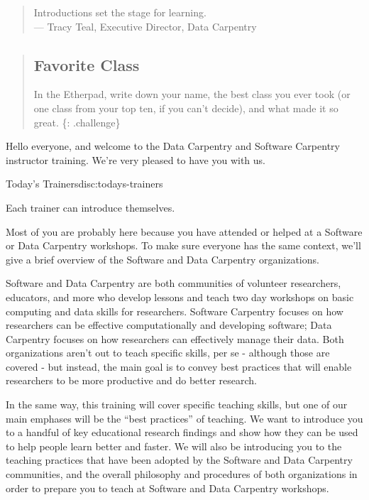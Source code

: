 
\begin{quote}
Introductions set the stage for learning.\\--- Tracy Teal, Executive
Director, Data Carpentry
\end{quote}

\begin{quote}
\subsection{Favorite Class}\label{favorite-class}

In the Etherpad, write down your name, the best class you ever took (or
one class from your top ten, if you can't decide), and what made it so
great. \{: .challenge\}
\end{quote}

Hello everyone, and welcome to the Data Carpentry and Software Carpentry
instructor training. We're very pleased to have you with us.

\begin{discussion}{Today's Trainers}{disc:todays-trainers}

Each trainer can introduce themselves.

\end{discussion}

Most of you are probably here because you have attended or helped at a
Software or Data Carpentry workshops. To make sure everyone has the same
context, we'll give a brief overview of the Software and Data Carpentry
organizations.

Software and Data Carpentry are both communities of volunteer
researchers, educators, and more who develop lessons and teach two day
workshops on basic computing and data skills for researchers. Software
Carpentry focuses on how researchers can be effective computationally
and developing software; Data Carpentry focuses on how researchers can
effectively manage their data. Both organizations aren't out to teach
specific skills, per se - although those are covered - but instead, the
main goal is to convey best practices that will enable researchers to be
more productive and do better research.

In the same way, this training will cover specific teaching skills, but
one of our main emphases will be the ``best practices'' of teaching. We
want to introduce you to a handful of key educational research findings
and show how they can be used to help people learn better and faster. We
will also be introducing you to the teaching practices that have been
adopted by the Software and Data Carpentry communities, and the overall
philosophy and procedures of both organizations in order to prepare you
to teach at Software and Data Carpentry workshops.

